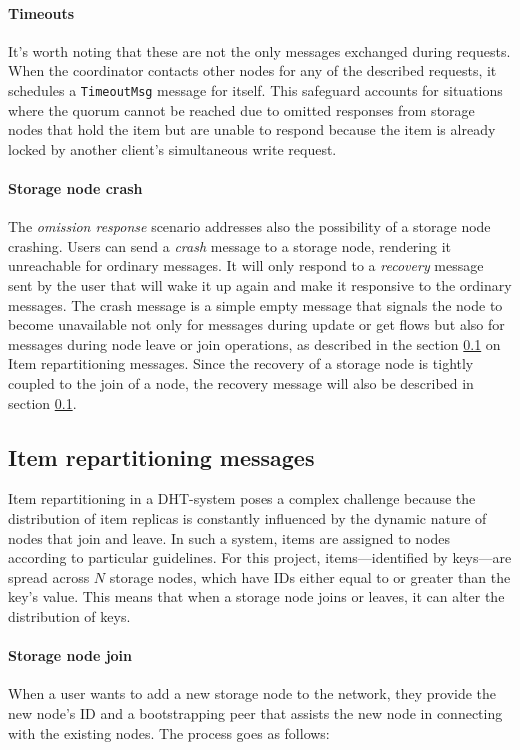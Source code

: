 \documentclass[a4paper, 11pt]{article}
\begin{document}
\paragraph{Timeouts} It's worth noting that these are not the only messages exchanged during requests. When the coordinator contacts other nodes for any of the described requests, it schedules a \verb|TimeoutMsg| message for itself. This safeguard accounts for situations where the quorum cannot be reached due to omitted responses from storage nodes that hold the item but are unable to respond because the item is already locked by another client's simultaneous write request.

\paragraph{Storage node crash} The \textit{omission response} scenario addresses also the possibility of a storage node crashing. Users can send a \textit{crash} message to a storage node, rendering it unreachable for ordinary messages. It will only respond to a \textit{recovery} message sent by the user that will wake it up again and make it responsive to the ordinary messages. The crash message is a simple empty message that signals the node to become unavailable not only for messages during update or get flows but also for messages during node leave or join operations, as described in the section \ref{Repartitioning_Messages} on Item repartitioning messages. Since the recovery of a storage node is tightly coupled to the join of a node, the recovery message will also be described in section \ref{Repartitioning_Messages}.

\subsection{Item repartitioning messages}\label{Repartitioning_Messages}

Item repartitioning in a DHT-system poses a complex challenge because the distribution of item replicas is constantly influenced by the dynamic nature of nodes that join and leave. In such a system, items are assigned to nodes according to particular guidelines. For this project, items—identified by keys—are spread across $N$ storage nodes, which have IDs either equal to or greater than the key's value. This means that when a storage node joins or leaves, it can alter the distribution of keys.

\paragraph{Storage node join} When a user wants to add a new storage node to the network, they provide the new node's ID and a bootstrapping peer that assists the new node in connecting with the existing nodes. The process goes as follows:
\end{document}
